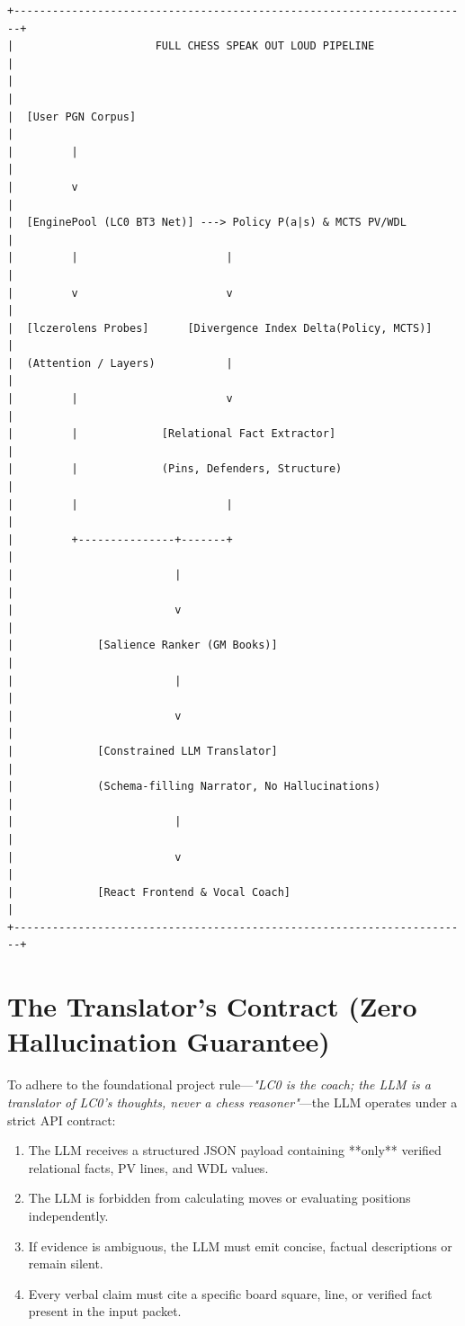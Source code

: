 \documentclass[11pt,a4paper]{report}
\begin{document}
\begin{verbatim}
+-----------------------------------------------------------------------+
|                      FULL CHESS SPEAK OUT LOUD PIPELINE               |
|                                                                       |
|  [User PGN Corpus]                                                    |
|         |                                                             |
|         v                                                             |
|  [EnginePool (LC0 BT3 Net)] ---> Policy P(a|s) & MCTS PV/WDL          |
|         |                       |                                     |
|         v                       v                                     |
|  [lczerolens Probes]      [Divergence Index Delta(Policy, MCTS)]      |
|  (Attention / Layers)           |                                     |
|         |                       v                                     |
|         |             [Relational Fact Extractor]                     |
|         |             (Pins, Defenders, Structure)                    |
|         |                       |                                     |
|         +---------------+-------+                                     |
|                         |                                             |
|                         v                                             |
|             [Salience Ranker (GM Books)]                              |
|                         |                                             |
|                         v                                             |
|             [Constrained LLM Translator]                              |
|             (Schema-filling Narrator, No Hallucinations)              |
|                         |                                             |
|                         v                                             |
|             [React Frontend & Vocal Coach]                            |
+-----------------------------------------------------------------------+
\end{verbatim}

\section{The Translator's Contract (Zero Hallucination Guarantee)}
To adhere to the foundational project rule---\textit{"LC0 is the coach; the LLM is a translator of LC0's thoughts, never a chess reasoner"}---the LLM operates under a strict API contract:
\begin{enumerate}
    \item The LLM receives a structured JSON payload containing **only** verified relational facts, PV lines, and WDL values.
    \item The LLM is forbidden from calculating moves or evaluating positions independently.
    \item If evidence is ambiguous, the LLM must emit concise, factual descriptions or remain silent.
    \item Every verbal claim must cite a specific board square, line, or verified fact present in the input packet.
\end{enumerate}
\end{document}
